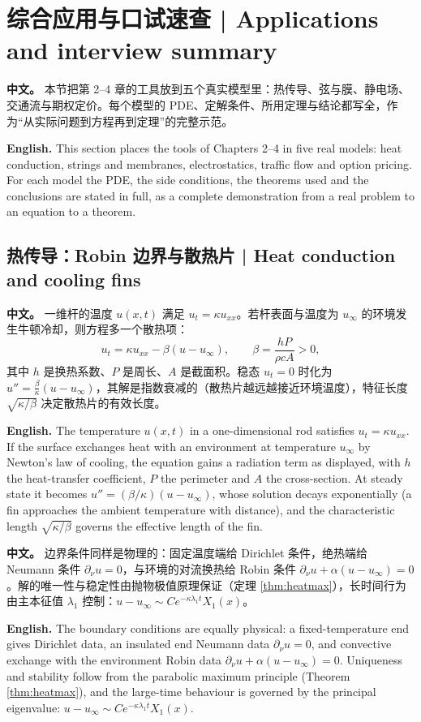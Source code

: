 \documentclass[UTF8,11pt,a4paper]{ctexart}
\newcommand{\APS}[2]{\par\noindent\textbf{中文。} #1\par\noindent\textbf{English.} #2\par\smallskip}
\begin{document}
\section{综合应用与口试速查 | Applications and interview summary}
\APS{本节把第 2--4 章的工具放到五个真实模型里：热传导、弦与膜、静电场、交通流与期权定价。每个模型的 PDE、定解条件、所用定理与结论都写全，作为``从实际问题到方程再到定理''的完整示范。}{This section places the tools of Chapters 2--4 in five real models: heat conduction, strings and membranes, electrostatics, traffic flow and option pricing. For each model the PDE, the side conditions, the theorems used and the conclusions are stated in full, as a complete demonstration from a real problem to an equation to a theorem.}

\subsection{热传导：Robin 边界与散热片 | Heat conduction and cooling fins}
\APS{一维杆的温度 $u(x,t)$ 满足 $u_t=\kappa u_{xx}$。若杆表面与温度为 $u_\infty$ 的环境发生牛顿冷却，则方程多一个散热项：
\[
u_t=\kappa u_{xx}-\beta(u-u_\infty),\qquad \beta=\frac{hP}{\rho cA}>0,
\]
其中 $h$ 是换热系数、$P$ 是周长、$A$ 是截面积。稳态 $u_t=0$ 时化为 $u''=\frac{\beta}{\kappa}(u-u_\infty)$，其解是指数衰减的（散热片越远越接近环境温度），特征长度 $\sqrt{\kappa/\beta}$ 决定散热片的有效长度。}{The temperature $u(x,t)$ in a one-dimensional rod satisfies $u_t=\kappa u_{xx}$. If the surface exchanges heat with an environment at temperature $u_\infty$ by Newton's law of cooling, the equation gains a radiation term as displayed, with $h$ the heat-transfer coefficient, $P$ the perimeter and $A$ the cross-section. At steady state it becomes $u''=(\beta/\kappa)(u-u_\infty)$, whose solution decays exponentially (a fin approaches the ambient temperature with distance), and the characteristic length $\sqrt{\kappa/\beta}$ governs the effective length of the fin.}

\APS{边界条件同样是物理的：固定温度端给 Dirichlet 条件，绝热端给 Neumann 条件 $\partial_\nu u=0$，与环境的对流换热给 Robin 条件 $\partial_\nu u+\alpha(u-u_\infty)=0$。解的唯一性与稳定性由抛物极值原理保证（定理 \ref{thm:heatmax}），长时间行为由主本征值 $\lambda_1$ 控制：$u-u_\infty\sim Ce^{-\kappa\lambda_1t}X_1(x)$。}{The boundary conditions are equally physical: a fixed-temperature end gives Dirichlet data, an insulated end Neumann data $\partial_\nu u=0$, and convective exchange with the environment Robin data $\partial_\nu u+\alpha(u-u_\infty)=0$. Uniqueness and stability follow from the parabolic maximum principle (Theorem \ref{thm:heatmax}), and the large-time behaviour is governed by the principal eigenvalue: $u-u_\infty\sim Ce^{-\kappa\lambda_1t}X_1(x)$.}
\end{document}
